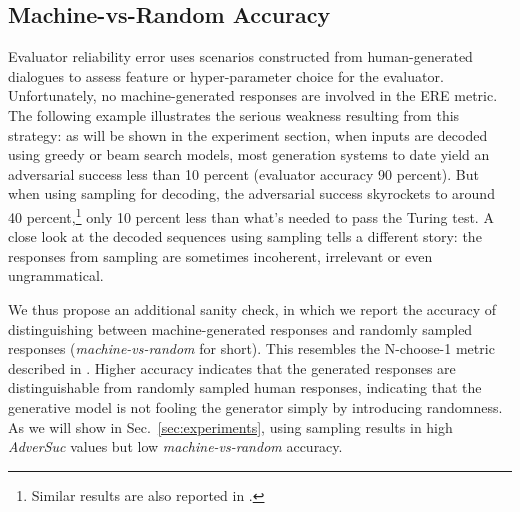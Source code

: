 \documentclass[11pt]{article}
\newcommand{\sts}{{{\textsc{Seq2Seq}}}\xspace}
\begin{document}
\subsection{Machine-vs-Random Accuracy}
Evaluator reliability error uses scenarios constructed from human-generated
dialogues to assess feature or hyper-parameter choice for the evaluator. Unfortunately, no machine-generated responses are involved in the ERE metric. 
The following example illustrates the serious weakness resulting from this strategy:
as will be shown in the experiment section, 
when inputs are decoded using greedy or beam search models,  
most generation systems to date yield an adversarial success less than 10 percent (evaluator accuracy 90 percent). 
But when using sampling for decoding, the adversarial success skyrockets to around 40 percent,\footnote{Similar results are also reported in .} only 10 percent less than what's needed to pass the Turing test. 
A close look at the decoded sequences using sampling tells a different story: the responses from sampling are sometimes incoherent, irrelevant or even ungrammatical. 

We thus propose an additional sanity check, in which we report the accuracy of distinguishing between machine-generated responses and randomly sampled responses ({\it machine-vs-random} for short). 
This resembles the N-choose-1 metric described in . 
Higher accuracy indicates that the generated responses are distinguishable from randomly sampled human responses, indicating that the generative model is not fooling the generator simply by introducing randomness. 
As we will show in Sec.~\ref{sec:experiments}, using sampling results in high {\it AdverSuc} values but low {\it machine-vs-random} accuracy. 
\begin{comment}
\subsection{A Special Issue: Sequence Length}
It is widely accepted that
\sts models have a extremely strong bias towards generating short responses \cite{sountsov2016length}, and it is usually hard to generate coherent and meaningful long responses \cite{shao15}. 
The length of the sequence is thus a feature that might dominate the evaluator.\footnote{Only using this single feature, a evaluator can achieve an accuracy of roughly 75 percent.} 
On one hand, we acknowledge the inferiority of algorithms to date and the incapability of generating long, coherent responses;
on the other hand, we also want to compare different models
and evaluate 
 different aspects of responses such as coherence, meaningfulness, etc. 
Excluding the effect of this predominant feature is thus favorable in comparing different models. 
In our experimental section, we will report the discriminative success both including and excluding the effect of sequence length. 
\end{comment}
\end{document}

